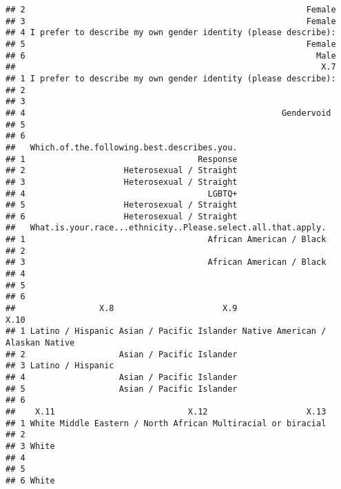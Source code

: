 \documentclass[
]{article}
\begin{document}
\begin{verbatim}
## 2                                                         Female
## 3                                                         Female
## 4 I prefer to describe my own gender identity (please describe):
## 5                                                         Female
## 6                                                           Male
##                                                              X.7
## 1 I prefer to describe my own gender identity (please describe):
## 2                                                               
## 3                                                               
## 4                                                    Gendervoid 
## 5                                                               
## 6                                                               
##   Which.of.the.following.best.describes.you.
## 1                                   Response
## 2                    Heterosexual / Straight
## 3                    Heterosexual / Straight
## 4                                     LGBTQ+
## 5                    Heterosexual / Straight
## 6                    Heterosexual / Straight
##   What.is.your.race...ethnicity..Please.select.all.that.apply.
## 1                                     African American / Black
## 2                                                             
## 3                                     African American / Black
## 4                                                             
## 5                                                             
## 6                                                             
##                 X.8                      X.9                             X.10
## 1 Latino / Hispanic Asian / Pacific Islander Native American / Alaskan Native
## 2                   Asian / Pacific Islander                                 
## 3 Latino / Hispanic                                                          
## 4                   Asian / Pacific Islander                                 
## 5                   Asian / Pacific Islander                                 
## 6                                                                            
##    X.11                           X.12                    X.13
## 1 White Middle Eastern / North African Multiracial or biracial
## 2                                                             
## 3 White                                                       
## 4                                                             
## 5                                                             
## 6 White                                                       

\end{verbatim}
\end{document}

